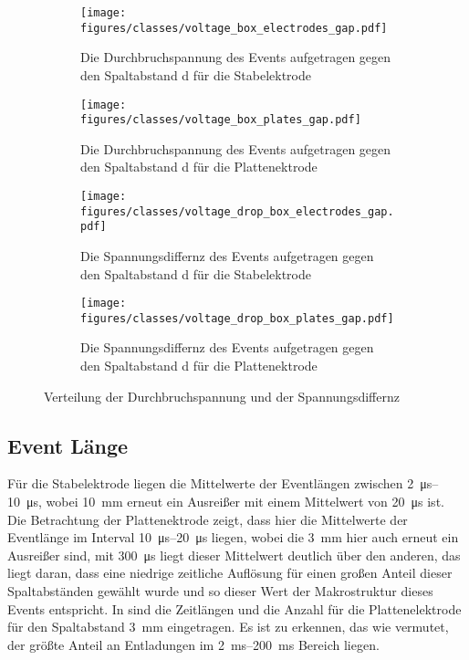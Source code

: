 \begin{figure}[H]
  \centering
  \begin{subfigure}[t]{0.48\textwidth}
    \centering
    \texttt{[image: figures/classes/voltage\_box\_electrodes\_gap.pdf]}
    \caption{Die Durchbruchspannung des Events aufgetragen gegen den Spaltabstand d für die Stabelektrode}
    \label{fig:box-gap-event-voltage-stab}
  \end{subfigure}
  \begin{subfigure}[t]{0.48\textwidth}
    \centering
    \texttt{[image: figures/classes/voltage\_box\_plates\_gap.pdf]}
    \caption{Die Durchbruchspannung des Events aufgetragen gegen den Spaltabstand d für die Plattenektrode}
    \label{fig:box-gap-event-voltage-plate}
  \end{subfigure}
  \centering
  \begin{subfigure}[t]{0.48\textwidth}
    \centering
    \texttt{[image: figures/classes/voltage\_drop\_box\_electrodes\_gap.pdf]}
    \caption{Die Spannungsdiffernz des Events aufgetragen gegen den Spaltabstand d für die Stabelektrode}
    \label{fig:box-gap-event-voltage-diff-stab}
  \end{subfigure}
  \begin{subfigure}[t]{0.48\textwidth}
    \centering
    \texttt{[image: figures/classes/voltage\_drop\_box\_plates\_gap.pdf]}
    \caption{Die Spannungsdiffernz des Events aufgetragen gegen den Spaltabstand d für die Plattenektrode}
    \label{fig:box-gap-event-voltage-diff-plate}
  \end{subfigure}
  \caption{Verteilung der Durchbruchspannung und der Spannungsdiffernz}
  \label{fig:box-gap-event-voltage-voltage-diff}
\end{figure}


\subsection{Event Länge}
Für die Stabelektrode liegen die Mittelwerte der Eventlängen zwischen \SIrange{2}{10}{\micro\second}, wobei \SI{10}{\milli\meter} erneut ein Ausreißer mit einem Mittelwert von \SI{20}{\micro\second} ist. Die Betrachtung der Plattenektrode  zeigt, dass hier die Mittelwerte der Eventlänge im Interval \SIrange{10}{20}{\micro\second} liegen, wobei die \SI{3}{\milli\meter} hier auch erneut ein Ausreißer sind, mit \SI{300}{\micro\second} liegt dieser Mittelwert deutlich über den anderen, das liegt daran, dass eine niedrige zeitliche Auflösung für einen großen Anteil dieser Spaltabständen gewählt wurde und so dieser Wert der Makrostruktur dieses Events entspricht. In  sind die Zeitlängen und die Anzahl für die Plattenelektrode für den Spaltabstand \SI{3}{\milli\meter} eingetragen. Es ist zu erkennen, das wie vermutet, der größte Anteil an Entladungen im \SIrange{2}{200}{\milli\second} Bereich liegen.

